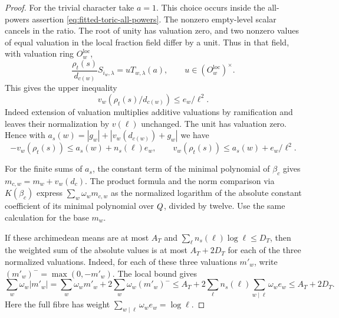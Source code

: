 \begin{proof}
For the trivial
character take \(a=1\). This choice occurs inside the
all-powers assertion \eqref{eq:fitted-toric-all-powers}.
The nonzero empty-level scalar cancels in the ratio.
The root of unity has valuation zero, and two nonzero values of equal valuation in the local fraction field
differ by a unit. Thus in that field, with valuation ring
\(O_w^{\mathrm{loc}}\),
\[
   \frac{\rho_t(s)}{d_{c(w)}}S_{i_w,\lambda}
       =uT_{w,\lambda}(a),\qquad u\in (O_w^{\mathrm{loc}})^\times .
\]
This gives the upper inequality
\[
 v_w(\rho_t(s)/d_{c(w)})\le e_w/\ell^2 .
\]
Indeed extension of valuation multiplies additive
valuations by ramification and leaves their normalization
by \(v(\ell)\) unchanged. The unit has valuation zero.
Hence with
\(a_s(w)=|g_w|+|v_w(d_{c(w)})+g_w|\) we have
\begin{equation}\label{eq:fitted-toric-two-sides}
  -v_w(\rho_t(s))\le a_s(w)+n_s(\ell)e_w,\qquad
  v_w(\rho_t(s))\le a_s(w)+e_w/\ell^2.
\end{equation}
\label{cor:fitted-square-ratios-5}


For the finite sums of \(a_s\), the constant term of the
minimal polynomial of \(\beta_c\) gives
\(m_{c,w}=m_w+v_w(d_c)\). The product formula and the norm
comparison via \(K(\beta_c)\) express
\(\sum_w\omega_w m_{c,w}\) as the normalized logarithm of the
absolute constant coefficient of its minimal polynomial over
\(Q\), divided by twelve. Use the same calculation for the
base \(m_w\).

If these archimedean means are at most \(A_T\)
and \(\sum_\ell n_s(\ell)\log\ell\le D_T\), then the weighted
sum of the absolute values is at most \(A_T+2D_T\) for each
of the three normalized valuations. Indeed, for each of these three valuations \(m'_w\), write
\((m'_w)^-=\max(0,-m'_w)\). The local bound gives
\[
 \sum_w\omega_w |m'_w|
 =\sum_w\omega_w m'_w+2\sum_w\omega_w (m'_w)^-
 \le A_T+2\sum_\ell n_s(\ell)\sum_{w\mid\ell}\omega_w e_w
 \le A_T+2D_T .
\]
Here the full fibre has weight \(\sum_{w\mid\ell}\omega_w e_w=\log\ell\).


\end{proof}
